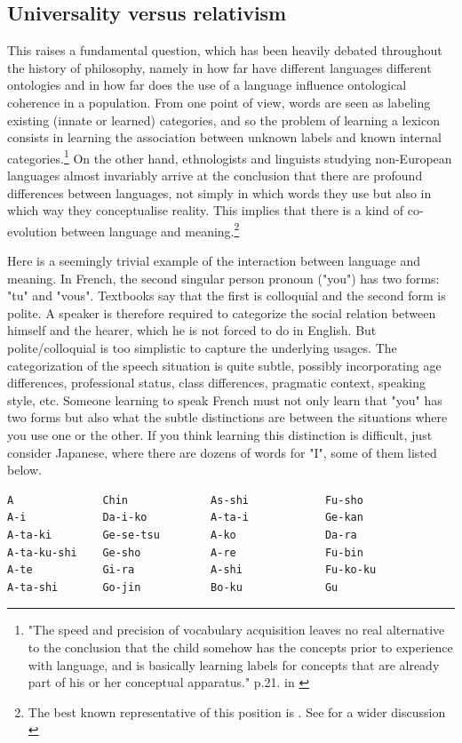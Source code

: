 \subsection{Universality versus relativism}

This raises a fundamental question, which has been
heavily debated throughout the history of 
philosophy, namely in how far have different languages
different ontologies and in how far does the use of a 
language influence ontological coherence in 
a population. From one point of view, words are seen as labeling 
existing (innate or learned) categories, and so the problem
of learning a lexicon consists in learning 
the association between unknown labels and 
known internal categories.\footnote{
"The speed and precision of vocabulary acquisition 
leaves no real alternative to the conclusion that the 
child somehow has the concepts prior to 
experience with language, and is basically learning 
labels for concepts that are already part of his or 
her conceptual apparatus." p.21. in \cite{Chomsky:1987}}
On the other hand, ethnologists and linguists studying 
non-European languages almost invariably arrive at the 
conclusion that there are profound differences between 
languages, not simply in which words they use but also 
in which way they conceptualise reality. This implies
that there is a kind of co-evolution between language
and meaning.\footnote{The best known representative of 
this position is \cite{Whorf:1956}. 
See for a wider discussion \cite{Lee:1996}}

Here is a seemingly trivial example of the interaction 
between language and meaning. In French, the second singular person
pronoun ("you") has two forms: 
"tu" and "vous". Textbooks say that the first is colloquial 
and the second form is polite. A speaker is therefore
required to categorize the social relation between himself
and the hearer, which he is not forced to do in English. 
But polite/colloquial is too simplistic to capture the 
underlying usages. The categorization of the speech 
situation is quite subtle, possibly incorporating
age differences, professional status, 
class differences, pragmatic context, speaking 
style, etc. Someone learning to speak French must not 
only learn that "you" has two forms but also what the 
subtle distinctions are between the situations where 
you use one or the other. If you think learning this distinction
is difficult, just consider Japanese, where there are 
dozens of words for "I", some of them listed below. 
\begin{verbatim}
A              Chin             As-shi            Fu-sho
A-i            Da-i-ko          A-ta-i            Ge-kan
A-ta-ki        Ge-se-tsu        A-ko              Da-ra
A-ta-ku-shi    Ge-sho           A-re              Fu-bin
A-te           Gi-ra            A-shi             Fu-ko-ku
A-ta-shi       Go-jin           Bo-ku             Gu
\end{verbatim}

